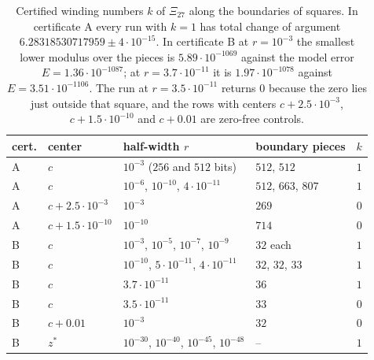 \documentclass[11pt]{article}
\theoremstyle{plain}
\theoremstyle{definition}
\theoremstyle{remark}
\begin{document}
\begin{table}[ht]
\centering\small
\begin{tabular}{llllc}
\toprule
cert. & center & half-width $r$ & boundary pieces & $k$ \\
\midrule
A & $c$ & $10^{-3}$ ($256$ and $512$ bits) & $512$, $512$ & $1$ \\
A & $c$ & $10^{-6}$, $10^{-10}$, $4\cdot10^{-11}$ & $512$, $663$, $807$ & $1$ \\
A & $c + 2.5\cdot10^{-3}$ & $10^{-3}$ & $269$ & $0$ \\
A & $c + 1.5\cdot10^{-10}$ & $10^{-10}$ & $714$ & $0$ \\
B & $c$ & $10^{-3}$, $10^{-5}$, $10^{-7}$, $10^{-9}$ & $32$ each & $1$ \\
B & $c$ & $10^{-10}$, $5\cdot10^{-11}$, $4\cdot10^{-11}$ & $32$, $32$, $33$ & $1$ \\
B & $c$ & $3.7\cdot10^{-11}$ & $36$ & $1$ \\
B & $c$ & $3.5\cdot10^{-11}$ & $33$ & $0$ \\
B & $c + 0.01$ & $10^{-3}$ & $32$ & $0$ \\
B & $z^*$ & $10^{-30}$, $10^{-40}$, $10^{-45}$, $10^{-48}$ & -- & $1$ \\
\bottomrule
\end{tabular}
\caption{Certified winding numbers $k$ of $\Xi_{27}$ along the boundaries of
squares. In certificate A every run with $k = 1$ has total change of argument
$6.28318530717959 \pm 4\cdot10^{-15}$. In certificate B at $r = 10^{-3}$ the
smallest lower modulus over the pieces is $5.89\cdot10^{-1069}$ against the model
error $E = 1.36\cdot10^{-1087}$; at $r = 3.7\cdot10^{-11}$ it is
$1.97\cdot10^{-1078}$ against $E = 3.51\cdot10^{-1106}$. The run at
$r = 3.5\cdot10^{-11}$ returns $0$ because the zero lies just outside that
square, and the rows with centers $c + 2.5\cdot10^{-3}$, $c + 1.5\cdot10^{-10}$
and $c + 0.01$ are zero-free controls.}
\label{tab:wind}
\end{table}
\end{document}
